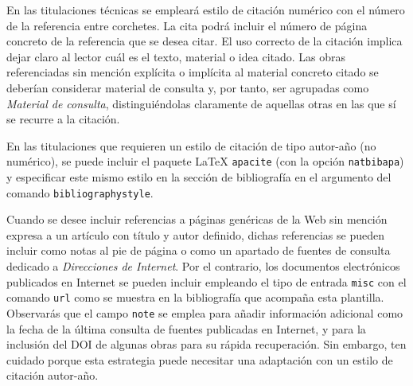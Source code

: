 En las titulaciones técnicas se empleará estilo de citación numérico con el número de la referencia entre corchetes. La cita podrá incluir el número de página concreto de la referencia que se desea citar. El uso correcto de la citación implica dejar claro al lector cuál es el texto, material o idea citado. Las obras referenciadas sin mención explícita o implícita al material concreto citado se deberían considerar material de consulta y, por tanto, ser agrupadas como \emph{Material de consulta}, distinguiéndolas claramente de aquellas otras en las que sí se recurre a la citación.

En las titulaciones que requieren un estilo de citación de tipo autor-año (no numérico), se puede incluir el paquete \LaTeX{} \texttt{apacite} (con la opción \texttt{natbibapa}) y especificar este mismo estilo en la sección de bibliografía en el argumento del comando \texttt{bibliographystyle}.

Cuando se desee incluir referencias a páginas genéricas de la Web sin mención expresa a un artículo con título y autor definido, dichas referencias se pueden incluir como notas al pie de página o como un apartado de fuentes de consulta dedicado a \emph{Direcciones de Internet}. Por el contrario, los documentos electrónicos publicados en Internet se pueden incluir empleando el tipo de entrada \texttt{misc} con el comando \texttt{url} como se muestra en la bibliografía que acompaña esta plantilla. Observarás que el campo \texttt{note} se emplea para añadir información adicional como la fecha de la última consulta de fuentes publicadas en Internet, y para la inclusión del DOI de algunas obras para su rápida recuperación. Sin embargo, ten cuidado porque esta estrategia puede necesitar una adaptación con un estilo de citación autor-año.







